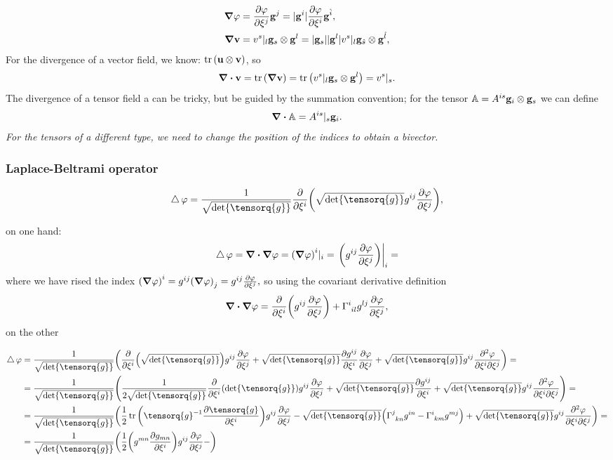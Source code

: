 \documentclass[reqno, a4paper]{article}
\begin{document}
\begin{align}
	\grad \varphi &= \pdv{\varphi}{\xi^j}\vb{g}^j = |\vb{g}^i|\pdv{\varphi}{\xi^i} \vb{g}^{\hat{i}},\\
	\grad \vb{v} &= v^s|_l \vb{g}_s \otimes \vb{g}^l = |\vb{g}_s| |\vb{g}^l| v^s|_l \vb{g}_{\hat{s}} \otimes \vb{g}^{\hat{l}}, 
\end{align}
For the divergence of a vector field, we know: $\tr\qty(\vb{u} \otimes \vb{v})$, so
\[
	\divergence{\vb{v}} = \tr\qty(\grad \vb{v}) = \tr\qty(v^s|_l \vb{g}_s \otimes \vb{g}^l) = v^s|_s.
\]
The divergence of a tensor field a can be tricky, but be guided by the summation convention; for the tensor $\mathbb{A} = A^{is}\vb{g}_i \otimes \vb{g}_s$ we can define
\[
	\divergence{\tensorq{A}} = A^{is}|_s \vb{g}_i.
\]
\textit{For the tensors of a different type, we need to change the position of the indices to obtain a bivector.}

\subsubsection{Laplace-Beltrami operator}
\label{sec:laplace_beltrami}

\[
	\laplace \varphi = \frac{1}{\sqrt{\det \tensorq{g}}}\pdv{\xi^i}\qty(\sqrt{\det \tensorq{g}} g^{ij} \pdv{\varphi}{\xi^j}),
\]

on one hand:
\begin{equation*}
	\laplace \varphi = \divergence{\grad \varphi}= \qty(\grad \varphi)^i|_i = \eval{\qty(g^{ij}\pdv{\varphi}{\xi^j})}_i = 
\end{equation*}
where we have rised the index $ \qty(\grad \varphi)^i = g^{ij}\qty(\grad \varphi)_j = g^{ij} \pdv{\varphi}{\xi^j},$ so using the covariant derivative definition
\[
	\divergence{\grad \varphi} = \pdv{\xi^i}\qty(g^{ij}\pdv{\varphi}{\xi^j})+ \Gamma \indices{^i_{il}} g^{lj} \pdv{\varphi}{\xi^j},
\]
on the other

\begin{align*}
\laplace \varphi &= \frac{1}{\sqrt{\det \tensorq{g}}}\qty(\pdv{\xi^i}\qty(\sqrt{\det \tensorq{g}})g^{ij}\pdv{\varphi}{\xi^j}+ \sqrt{\det \tensorq{g}} \pdv{g^{ij}}{\xi^i}\pdv{\varphi}{\xi^j}+ \sqrt{\det \tensorq{g}} g^{ij} \pdv[2]{\varphi}{\xi^i}{\xi^j}) = \\
			 &= \frac{1}{\sqrt{\det \tensorq{g}}} \qty(\frac{1}{2\sqrt{\det \tensorq{g}}}\pdv{\xi^i} \qty(\det \tensorq{g})g^{ij}\pdv{\varphi}{\xi^j}+\sqrt{\det \tensorq{g}}\pdv{g^{ij}}{\xi^i}+ \sqrt{\det \tensorq{g}} g^{ij}\pdv[2]{\varphi}{\xi^i}{\xi^j}) = \\
			 & = \frac{1}{\sqrt{\det \tensorq{g}}}\qty(\frac{1}{2}\tr\qty(\inverse{\tensorq{g}} \pdv{\tensorq{g}}{\xi^i})g^{ij}\pdv{\varphi}{\xi^j}-\sqrt{\det \tensorq{g}} \qty(\Gamma \indices{^j_{kn}}g^{in}- \Gamma \indices{^i_{km}}g^{mj})+ \sqrt{\det \tensorq{g}}g^{ij}\pdv[2]{\varphi}{\xi^i}{\xi^j}) = \\
			 & = \frac{1}{\sqrt{\det \tensorq{g}}}\qty(\frac{1}{2}\qty(g^{mn} \pdv{g_{mn}}{\xi^i})g^{ij}\pdv{\varphi}{\xi^j}-)
\end{align*}
\end{document}
